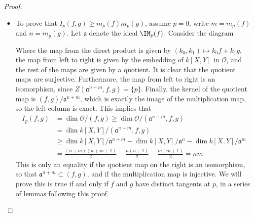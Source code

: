 \begin{proof}
\begin{itemize}
        \item To prove that $I_p(f,g) \geq m_p(f) m_p(g)$, assume $p = 0$, write $m = m_p(f)$ and $n = m_p(g)$. Let $\mathfrak{a}$ denote the ideal $\IM_p(f)$. Consider the diagram
    \begin{center}
    \end{center}
    Where the map from the direct product is given by $(k_0,k_1) \mapsto k_0f + k_1g$, the map from left to right is given by the embedding of $k[X,Y]$ in $\mathcal{O}$, and the rest of the maps are given by a quotient. It is clear that the quotient maps are surjective. Furthermore, the map from left to right is an isomorphism, since $Z(\mathfrak{a}^{n+m},f,g) = \{ p \}$. Finally, the kernel of the quotient map is $(f,g)/\mathfrak{a}^{n+m}$, which is exactly the image of the multiplication map, so the left column is exact. This implies that
    \begin{align*}
        I_p(f,g) &= \dim \mathcal{O}/(f,g) \geq \dim \mathcal{O}/(\mathfrak{a}^{n+m},f,g)\\
        &= \dim k[X,Y]/(\mathfrak{a}^{n+m},f,g)\\
        &\geq \dim k[X,Y]/\mathfrak{a}^{n+m} - \dim k[X,Y]/\mathfrak{a}^n - \dim k[X,Y]/\mathfrak{a}^m\\
        &= \frac{(n+m)(n+m+1)}{2} - \frac{n(n+1)}{2} - \frac{m(m+1)}{2} = nm
    \end{align*}
    This is only an equality if the quotient map on the right is an isomorphism, so that $\mathfrak{a}^{n+m} \subset (f,g)$, and if the multiplication map is injective. We will prove this is true if and only if $f$ and $g$ have distinct tangents at $p$, in a series of lemmas following this proof. \qedhere
    \end{itemize}
\end{proof}

